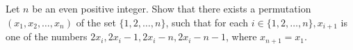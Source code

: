 Let $n$ be an even positive integer. Show that there exists a permutation $(x_1, x_2, \ldots, x_n)$ of the set $\{1, 2, \ldots, n\}$, such that for each $i \in \{1, 2, \ldots, n\}, x_{i+1}$ is one of the numbers $2x_i, 2x_{i}-1, 2x_i - n, 2x_i - n - 1$, where $x_{n+1} = x_1.$